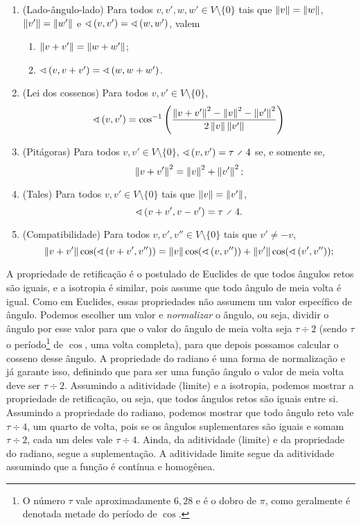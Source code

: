 \begin{enumerate}
		\item (Lado-ângulo-lado) Para todos $v,v',w,w' \in V \setminus \{0\}$ tais que $\left\Vert{v}\right\Vert=\left\Vert{w}\right\Vert$, $\left\Vert{v'}\right\Vert=\left\Vert{w'}\right\Vert$ e $\sphericalangle\left({v},{v'}\right)=\sphericalangle\left({w},{w'}\right)$, valem
			\begin{enumerate}
				\item $\left\Vert{v+v'}\right\Vert=\left\Vert{w+w'}\right\Vert$;
				\item $\sphericalangle\left({v},{v+v'}\right)=\sphericalangle\left({w},{w+w'}\right)$.
			\end{enumerate}
		\item (Lei dos cossenos) Para todos $v,v' \in V \setminus \{0\}$,
			\begin{equation*}
				\sphericalangle\left({v},{v'}\right) = \cos^{-1} \left( \frac{\left\Vert{v+v'}\right\Vert^2 - \left\Vert{v}\right\Vert^2-\left\Vert{v'}\right\Vert^2}{2\left\Vert{v}\right\Vert\left\Vert{v'}\right\Vert} \right)
			\end{equation*}
		\item (Pitágoras) Para todos $v,v' \in V \setminus \{0\}$, $\ang{v}{v'}=\tau \div 4$ se, e somente se,
			\begin{equation*}
				\left\Vert{v+v'}\right\Vert^2 = \left\Vert{v}\right\Vert^2 + \left\Vert{v'}\right\Vert^2;
			\end{equation*}
		\item (Tales) Para todos $v,v' \in V \setminus \{0\}$ tais que $\left\Vert{v}\right\Vert=\left\Vert{v'}\right\Vert$,
			\begin{equation*}
				\ang{v+v'}{v-v'} = \tau \div 4.
			\end{equation*}
		\item (Compatibilidade) Para todos $v,v',v'' \in V \setminus \{0\}$ tais que $v' \neq -v$,
			\begin{equation*}
				\left\Vert{v+v'}\right\Vert\cos(\sphericalangle\left({v+v'},{v''}\right)) = \left\Vert{v}\right\Vert\cos(\sphericalangle\left({v},{v''}\right)) + \left\Vert{v'}\right\Vert\cos(\sphericalangle\left({v'},{v''}\right));
			\end{equation*}
	\end{enumerate}

A propriedade de retificação é o postulado de Euclides de que todos ângulos retos são iguais, e a isotropia é similar, pois assume que todo ângulo de meia volta é igual. Como em Euclides, essas propriedades não assumem um valor específico de ângulo. Podemos escolher um valor e \textit{normalizar} o ângulo, ou seja, dividir o ângulo por esse valor para que o valor do ângulo de meia volta seja $\tau \div 2$ (sendo $\tau$ o período\footnote{O número $\tau$ vale aproximadamente $6,\!28$ e é o dobro de $\pi$, como geralmente é denotada metade do período de $\cos$.} de $\cos$, uma volta completa), para que depois possamos calcular o cosseno desse ângulo. A propriedade do radiano é uma forma de normalização e já garante isso, definindo que para ser uma função ângulo o valor de meia volta deve ser $\tau \div 2$. Assumindo a aditividade (limite) e a isotropia, podemos mostrar a propriedade de retificação, ou seja, que todos ângulos retos são iguais entre si. Assumindo a propriedade do radiano, podemos mostrar que todo ângulo reto vale $\tau \div 4$, um quarto de volta, pois se os ângulos suplementares são iguais e somam $\tau \div 2$, cada um deles vale $\tau \div 4$. Ainda, da aditividade (limite) e da propriedade do radiano, segue a suplementação. A aditividade limite segue da aditividade assumindo que a função é contínua e homogênea.

